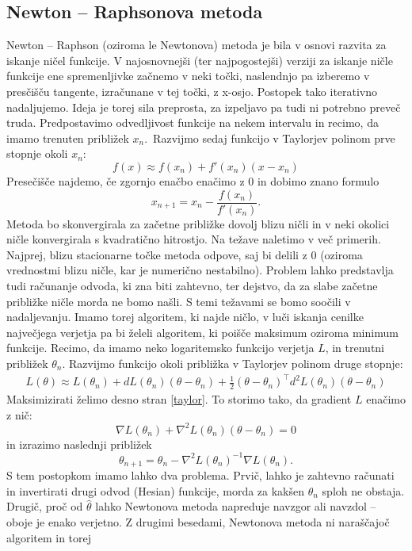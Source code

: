 \documentclass[12pt,a4paper]{amsart}
\theoremstyle{definition} %
\theoremstyle{plain} %
\begin{document}
\subsection{Newton -- Raphsonova metoda} \label{nr}
Newton -- Raphson (oziroma le Newtonova) metoda je bila v osnovi razvita za iskanje ničel funkcije. V najosnovnejši (ter najpogostejši) verziji za iskanje
ničle funkcije ene spremenljivke začnemo v neki točki, naslendnjo pa izberemo v presčišču tangente, izračunane v 
tej točki, z x-osjo. Postopek tako iterativno nadaljujemo. Ideja je torej sila preprosta, za izpeljavo pa tudi ni potrebno preveč truda.
Predpostavimo odvedljivost funkcije na nekem intervalu in recimo, da imamo trenuten približek $x_{n}.$~Razvijmo sedaj funkcijo v Taylorjev
polinom prve stopnje okoli $x_{n}:$
\[
    f(x) \approx f(x_{n}) + f'(x_{n})(x - x_{n})
\]
Presečišče najdemo, če zgornjo enačbo enačimo z 0 in dobimo znano formulo
\[
    x_{n+1} = x_{n} - \frac{f(x_{n})}{f'(x_{n})}.
\]
Metoda bo skonvergirala za začetne približke dovolj blizu ničli in v neki okolici ničle konvergirala s kvadratično hitrostjo. 
Na težave naletimo v več primerih. Najprej, blizu stacionarne točke metoda odpove, saj bi delili z 0 (oziroma vrednostmi blizu ničle, kar je numerično nestabilno).
Problem lahko predstavlja tudi računanje odvoda, ki zna biti zahtevno, ter dejstvo, da za slabe začetne približke ničle morda ne bomo našli. S temi 
težavami se bomo soočili v nadaljevanju.
Imamo torej algoritem, ki najde ničlo, v luči iskanja cenilke največjega verjetja pa bi želeli algoritem, ki poišče maksimum oziroma minimum funkcije.
Recimo, da imamo neko logaritemsko funkcijo verjetja $L$, in trenutni približek $\theta_{n}$. Razvijmo funkcijo okoli približka v Taylorjev polinom
druge stopnje:
\begin{align}
    L(\theta) \approx L(\theta_{n}) + dL(\theta_{n})(\theta - \theta_{n}) + \frac{1}{2}(\theta - \theta_{n})^\top d^{2}L(\theta_{n})(\theta - \theta_{n}) \label{taylor}   
\end{align}
Maksimizirati želimo desno stran \eqref{taylor}. To storimo tako, da gradient $L$ enačimo z nič:
\[
    \nabla L(\theta_{n}) + \nabla^2L(\theta_{n})(\theta - \theta_{n}) = 0  
\]
in izrazimo naslednji približek
\[
    \theta_{n + 1} = \theta_{n} - \nabla^{2}L(\theta_{n})^{-1}\nabla L(\theta_{n}).
\]
S tem postopkom imamo lahko dva problema. Prvič, lahko je zahtevno računati in invertirati drugi odvod (Hesian) funkcije, morda za kakšen $\theta_{n}$ sploh ne obstaja.
Drugič, proč od $\hat{\theta}$ lahko Newtonova metoda napreduje navzgor ali navzdol -- oboje je enako verjetno. Z drugimi besedami, Newtonova metoda ni naraščajoč algoritem in torej
\end{document}
